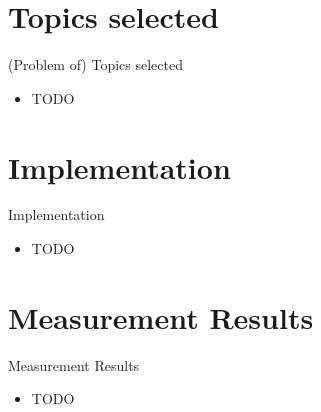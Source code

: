 \documentclass{beamer}
\begin{document}

\section{Topics selected}


\begin{frame}{(Problem of) Topics selected}

\begin{itemize}
  \item TODO
\end{itemize}

\end{frame}


\section{Implementation}


\begin{frame}{Implementation}

\begin{itemize}
  \item TODO
\end{itemize}

\end{frame}


\section{Measurement Results}


\begin{frame}{Measurement Results}

\begin{itemize}
  \item TODO
\end{itemize}

\end{frame}

\end{document}
